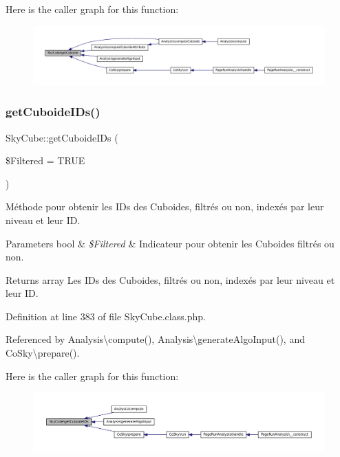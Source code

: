 Here is the caller graph for this function\+:\nopagebreak
\begin{figure}[H]
\begin{center}
\leavevmode
\includegraphics[width=350pt]{class_sky_cube_a18c6b3ec100eb483e941b8bb69c40187_icgraph}
\end{center}
\end{figure}
\mbox{\label{class_sky_cube_ad23b0dcc8513aaa0ce95fee26dfbee0e}} 
\subsubsection{\texorpdfstring{get\+Cuboide\+I\+Ds()}{getCuboideIDs()}}
{\footnotesize\ttfamily Sky\+Cube\+::get\+Cuboide\+I\+Ds (\begin{DoxyParamCaption}\item[{}]{\$\+Filtered = {\ttfamily TRUE} }\end{DoxyParamCaption})}

Méthode pour obtenir les I\+Ds des Cuboides, filtrés ou non, indexés par leur niveau et leur ID.


\begin{DoxyParams}[1]{Parameters}
bool & {\em \$\+Filtered} & Indicateur pour obtenir les Cuboides filtrés ou non. \\
\hline
\end{DoxyParams}
\begin{DoxyReturn}{Returns}
array Les I\+Ds des Cuboides, filtrés ou non, indexés par leur niveau et leur ID. 
\end{DoxyReturn}


Definition at line 383 of file Sky\+Cube.\+class.\+php.



Referenced by Analysis\textbackslash{}compute(), Analysis\textbackslash{}generate\+Algo\+Input(), and Co\+Sky\textbackslash{}prepare().

Here is the caller graph for this function\+:\nopagebreak
\begin{figure}[H]
\begin{center}
\leavevmode
\includegraphics[width=350pt]{class_sky_cube_ad23b0dcc8513aaa0ce95fee26dfbee0e_icgraph}
\end{center}
\end{figure}
\mbox{\label{class_sky_cube_aabad14a4963a4b7f890e5e7abcb5f67b}} 
